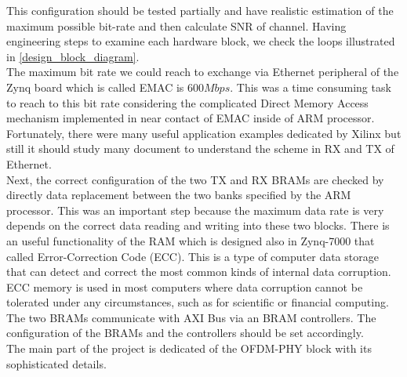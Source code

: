 This configuration should be tested partially and have realistic estimation of the maximum possible bit-rate and then calculate SNR of channel. Having engineering steps to examine each hardware block, we check the loops illustrated in \ref{design_block_diagram}.\\
The maximum bit rate we could reach to exchange via Ethernet peripheral of the Zynq board which is called EMAC is $600 Mbps$. This was a time consuming task to reach to this bit rate considering the complicated Direct Memory Access mechanism implemented in near contact of EMAC inside of ARM processor. Fortunately, there were many useful application examples dedicated by Xilinx but still it should study many document to understand the scheme in RX and TX of Ethernet.\\
Next, the correct configuration of the two TX and RX BRAMs are checked by directly data replacement between the two banks specified by the ARM processor. This was an important step because the maximum data rate is very depends on the correct data reading and writing into these two blocks. There is an useful functionality of the RAM which is designed also in Zynq-7000 that called Error-Correction Code (ECC). This is a type of computer data storage that can detect and correct the most common kinds of internal data corruption. ECC memory is used in most computers where data corruption cannot be tolerated under any circumstances, such as for scientific or financial computing. The two BRAMs communicate with AXI Bus via an BRAM controllers. The configuration of the BRAMs and the controllers should be set accordingly.\\
The main part of the project is dedicated of the OFDM-PHY block with its sophisticated details.\\

